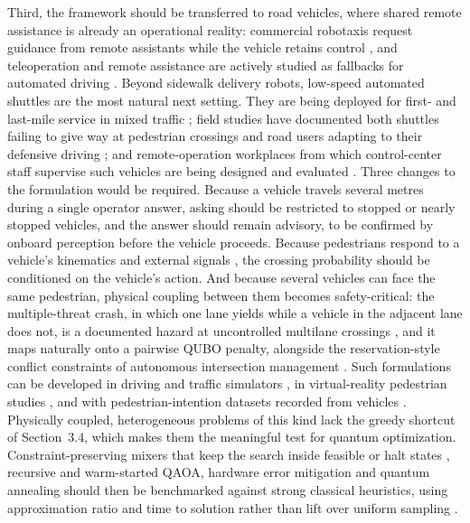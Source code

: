 \documentclass[a4paper,fleqn]{cas-dc}
\begin{document}
Third, the framework should be transferred to road vehicles, where shared remote assistance is already an operational reality: commercial robotaxis request guidance from remote assistants while the vehicle retains control \cite{Waymo2024}, and teleoperation and remote assistance are actively studied as fallbacks for automated driving \cite{Majstorovic2022,Mutzenich2021}. Beyond sidewalk delivery robots, low-speed automated shuttles are the most natural next setting. They are being deployed for first- and last-mile service in mixed traffic \cite{Ainsalu2018,Nordhoff2018}; field studies have documented both shuttles failing to give way at pedestrian crossings and road users adapting to their defensive driving \cite{DeCeunynck2022,Bjornskau2023}; and remote-operation workplaces from which control-center staff supervise such vehicles are being designed and evaluated \cite{Kettwich2021,Schrank2024}. Three changes to the formulation would be required. Because a vehicle travels several metres during a single operator answer, asking should be restricted to stopped or nearly stopped vehicles, and the answer should remain advisory, to be confirmed by onboard perception before the vehicle proceeds. Because pedestrians respond to a vehicle's kinematics and external signals \cite{Dey2020,Domeyer2020}, the crossing probability should be conditioned on the vehicle's action. And
because several vehicles can face the same pedestrian, physical coupling between them becomes safety-critical: the multiple-threat crash, in which one lane yields while a vehicle in the adjacent lane does not, is a documented hazard at uncontrolled multilane crossings \cite{Zegeer2005}, and it maps naturally onto a pairwise QUBO penalty, alongside the reservation-style conflict constraints of autonomous intersection management
\cite{DresnerStone2008}. Such formulations can be developed in driving and traffic simulators \cite{Dosovitskiy2017,Lopez2018}, in virtual-reality pedestrian studies \cite{Deb2017}, and with pedestrian-intention datasets recorded from vehicles \cite{Rasouli2017}. Physically coupled, heterogeneous problems of this kind lack the greedy shortcut of Section~3.4, which makes them the meaningful test for quantum optimization. Constraint-preserving mixers that keep the search inside feasible or halt states \cite{Hadfield2019,Wang2020}, recursive and warm-started QAOA, hardware error mitigation \cite{Temme2017,Kandala2019} and quantum annealing \cite{Neukart2017} should then be benchmarked against strong
classical heuristics, using approximation ratio and time to solution rather than lift over uniform sampling \cite{Lykov2023,Shaydulin2024}.
\end{document}
